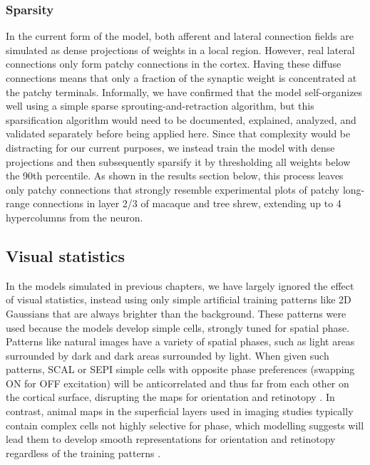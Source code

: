 \subsubsection{Sparsity}

In the current form of the model, both afferent and lateral connection
fields are simulated as dense projections of weights in a local
region. However, real lateral connections only form patchy connections
in the cortex. Having these diffuse connections means that only a
fraction of the synaptic weight is concentrated at the patchy
terminals. Informally, we have confirmed that the model self-organizes
well using a simple sparse sprouting-and-retraction algorithm, but
this sparsification algorithm would need to be documented, explained,
analyzed, and validated separately before being applied here. Since
that complexity would be distracting for our current purposes, we
instead train the model with dense projections and then subsequently
sparsify it by thresholding all weights below the 90th percentile. As
shown in the results section below, this process leaves only patchy
connections that strongly resemble experimental plots of patchy
long-range connections in layer 2/3 of macaque and tree shrew,
extending up to 4 hypercolumns from the neuron.

\subsection{Visual statistics}

In the models simulated in previous chapters, we have largely ignored
the effect of visual statistics, instead using only simple artificial
training patterns like 2D Gaussians that are always brighter than the
background.  These patterns were used because the models develop
simple cells, strongly tuned for spatial phase.  Patterns like natural
images have a variety of spatial phases, such as light areas
surrounded by dark and dark areas surrounded by light.  When given
such patterns, SCAL or SEPI simple cells with opposite phase
preferences (swapping ON for OFF excitation) will be anticorrelated
and thus far from each other on the cortical surface, disrupting the
maps for orientation and retinotopy \citep{Miikkulainen2005}.  In
contrast, animal maps in the superficial layers used in imaging
studies typically contain complex cells not highly selective for
phase, which modelling suggests will lead them to develop smooth
representations for orientation and retinotopy regardless of the
training patterns \citep{Antolik2010}.

